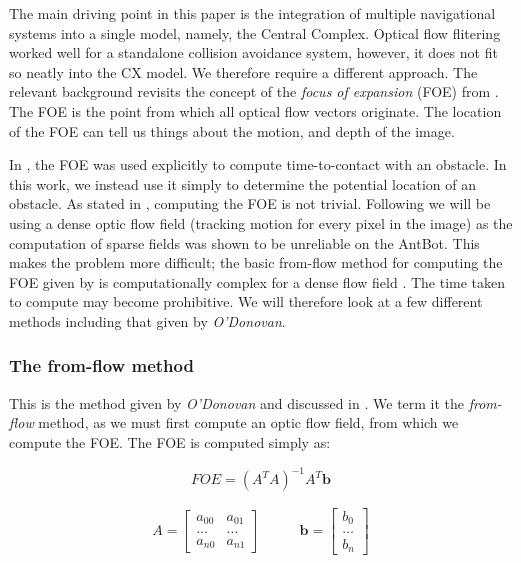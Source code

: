 \documentclass[a4paper,11pt,twoside,openright]{article}
\begin{document}
The main driving point in this paper is the integration of multiple navigational
systems into a single model, namely, the Central Complex.
Optical flow flitering worked well for a standalone collision avoidance system,
however, it does not fit so neatly into the CX model. We therefore require a
different approach. The relevant background revisits the concept of the
\textit{focus of expansion} (FOE) from \cite{Mitchell2018, ODonovan2005}.
The FOE is the point from which all optical flow vectors originate. The location
of the FOE can tell us things about the motion, and depth of the image.
\newline
\par

In \cite{Mitchell2018}, the FOE was used explicitly to compute time-to-contact
with an obstacle. In this work, we instead use it simply to determine the
potential location of an obstacle. As stated in \cite{Burger1989}, computing the
FOE is not trivial. Following \cite{Mitchell2018} we will be using a dense
optic flow field (tracking motion for every pixel in the image) as the
computation of sparse fields was shown to be unreliable on the AntBot. This makes
the problem more difficult; the basic from-flow method for computing the FOE
given by \cite{ODonovan2005} is computationally complex for a dense flow field
\cite{Mitchell2018}. The time taken to compute may become prohibitive. We will
therefore look at a few different methods including that given by
\textit{O'Donovan}.

\subsubsection{The from-flow method}
This is the method given by \textit{O'Donovan} and discussed in
\cite{Mitchell2018}. We term it the \textit{from-flow} method, as we must first
compute an optic flow field, from which we compute the FOE. The FOE is computed
simply as:

\begin{equation}
  \label{eq:foe}
  FOE = (A^TA)^{-1}A^T\mathbf{b}
\end{equation}

\begin{equation*}
  \begin{split}
 A = 
\begin{bmatrix}
  a_{00} & a_{01}\\
  \dots  & \dots \\
  a_{n0} &  a_{n1}
\end{bmatrix}
\qquad
\end{split}
\begin{split}
\mathbf{b} =
\begin{bmatrix}
  b_0 \\
  \dots \\
  b_n
\end{bmatrix}
\end{split}
\end{equation*}
\newline
\end{document}
